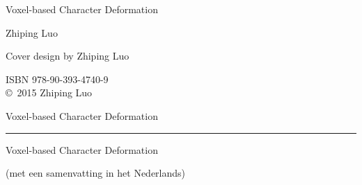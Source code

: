 \frontmatter

\begin{titlepage}
\setcounter{page}{1}%

\vspace*{1em}
\begin{center}
\Huge Voxel-based Character Deformation
\end{center}
\vfill\vfill\vfill\vfill\vfill

\begin{center}
\LARGE Zhiping Luo
\end{center}

\newpage
\thispagestyle{empty}%



\vspace*{1.5ex}
\vfill\vfill\vfill\vfill\vfill\vfill\vfill
\medskip
\noindent Cover design by Zhiping Luo

\medskip

\noindent
	ISBN 978-90-393-4740-9
\medskip
\\
\noindent
\copyright~2015 Zhiping Luo

\newpage
\thispagestyle{empty}%

\vspace*{1em}
\begin{center}
\Huge Voxel-based Character Deformation

\normalsize\vspace*{.8em}
\hrule

\vspace*{1em}


\end{center}

\vfill\vfill\vfill\vfill\vfill

\begin{center}
\noindent\LARGE Voxel-based Character Deformation

\normalsize\vspace*{.6em}

\vspace*{0.9em}


\vspace*{0.6ex}

\noindent\normalsize (met een samenvatting in het Nederlands)
\end{center}


\end{titlepage}
